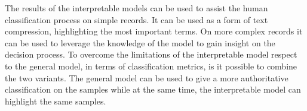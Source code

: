 The results of the interpretable models can be used to
assist the human classification process on simple records. It can be
used as
a form of text compression, highlighting the most important terms. On
more complex records it can be used to leverage the knowledge of the
model to gain insight on the decision process. To overcome the
limitations of the interpretable
model respect to the general model, in terms of
classification metrics, is it possible to combine the two variants. The
general model can be used to give a more
authoritative classification on the samples while at the same time,
the interpretable model can highlight the same samples.


